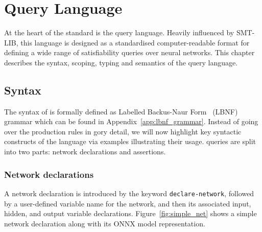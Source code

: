 \chapter{\vnnlib{} Query Language}\label{sec:specification_language}

At the heart of the \vnnlib{} standard is the \vnnlib{} query language. Heavily influenced by SMT-LIB, this language is designed as a standardised computer-readable format for defining a wide range of satisfiability queries over neural networks. This chapter describes the syntax, scoping, typing and semantics of the query language.

\section{Syntax}
\label{sec:syntax}

The syntax of \vnnlib{} is formally defined as Labelled Backus-Naur Form~\cite{8} (LBNF) grammar which can be found in Appendix~\ref{app:lbnf_grammar}. Instead of going over the production rules in gory detail, we will now highlight key syntactic constructs of the language via examples illustrating their usage.
\vnnlib{} queries are split into two parts: network declarations and assertions.

\subsection{Network declarations}
\label{sec:network-declarations}
A network declaration is introduced by the keyword \texttt{declare-network}, followed by a user-defined variable name for the network, 
and then its associated input, hidden, and output variable declarations. Figure~\ref{fig:simple_net} shows a simple network declaration along with its ONNX
model representation.

